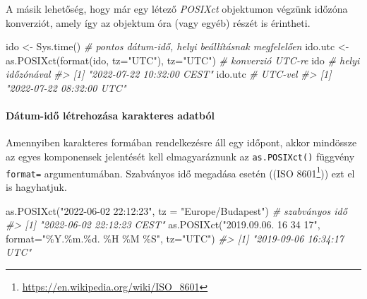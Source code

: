 \documentclass[
]{book}
\newenvironment{Shaded}{\begin{snugshade}}{\end{snugshade}}
\newcommand{\AttributeTok}[1]{\textcolor[rgb]{0.77,0.63,0.00}{#1}}
\newcommand{\CommentTok}[1]{\textcolor[rgb]{0.56,0.35,0.01}{\textit{#1}}}
\newcommand{\FunctionTok}[1]{\textcolor[rgb]{0.00,0.00,0.00}{#1}}
\newcommand{\NormalTok}[1]{#1}
\newcommand{\OtherTok}[1]{\textcolor[rgb]{0.56,0.35,0.01}{#1}}
\newcommand{\StringTok}[1]{\textcolor[rgb]{0.31,0.60,0.02}{#1}}
\DeclareRobustCommand{\href}[2]{#2\footnote{\url{#1}}}
\renewcommand{\href}[2]{#2\footnote{\url{#1}}}
\begin{document}
A másik lehetőség, hogy már egy létező \emph{POSIXct} objektumon végzünk időzóna konverziót, amely így az objektum óra (vagy egyéb) részét is érintheti.

\begin{Shaded}
\begin{Highlighting}[]
\NormalTok{ido }\OtherTok{\textless{}{-}} \FunctionTok{Sys.time}\NormalTok{()  }\CommentTok{\# pontos dátum{-}idő, helyi beállításnak megfelelően}
\NormalTok{ido.utc }\OtherTok{\textless{}{-}} \FunctionTok{as.POSIXct}\NormalTok{(}\FunctionTok{format}\NormalTok{(ido, }\AttributeTok{tz=}\StringTok{"UTC"}\NormalTok{), }\AttributeTok{tz=}\StringTok{"UTC"}\NormalTok{)  }\CommentTok{\# konverzió UTC{-}re}
\NormalTok{ido        }\CommentTok{\# helyi időzónával}
\CommentTok{\#\textgreater{} [1] "2022{-}07{-}22 10:32:00 CEST"}
\NormalTok{ido.utc    }\CommentTok{\# UTC{-}vel}
\CommentTok{\#\textgreater{} [1] "2022{-}07{-}22 08:32:00 UTC"}
\end{Highlighting}
\end{Shaded}

\hypertarget{duxe1tum-idux151-luxe9trehozuxe1sa-karakteres-adatbuxf3l}{%
\paragraph{Dátum-idő létrehozása karakteres adatból}\label{duxe1tum-idux151-luxe9trehozuxe1sa-karakteres-adatbuxf3l}}

Amennyiben karakteres formában rendelkezésre áll egy időpont, akkor mindössze az egyes komponensek jelentését kell elmagyaráznunk az \texttt{as.POSIXct()} függvény \texttt{format=} argumentumában. Szabványos idő megadása esetén ((\href{https://en.wikipedia.org/wiki/ISO_8601}{ISO 8601})) ezt el is hagyhatjuk.

\begin{Shaded}
\begin{Highlighting}[]
\FunctionTok{as.POSIXct}\NormalTok{(}\StringTok{"2022{-}06{-}02 22:12:23"}\NormalTok{, }\AttributeTok{tz =} \StringTok{"Europe/Budapest"}\NormalTok{)  }\CommentTok{\# szabványos idő}
\CommentTok{\#\textgreater{} [1] "2022{-}06{-}02 22:12:23 CEST"}
\FunctionTok{as.POSIXct}\NormalTok{(}\StringTok{"2019.09.06. 16 34 17"}\NormalTok{, }\AttributeTok{format=}\StringTok{"\%Y.\%m.\%d. \%H \%M \%S"}\NormalTok{, }\AttributeTok{tz=}\StringTok{"UTC"}\NormalTok{)}
\CommentTok{\#\textgreater{} [1] "2019{-}09{-}06 16:34:17 UTC"}
\end{Highlighting}
\end{Shaded}
\end{document}
